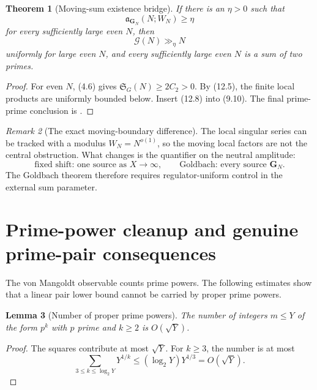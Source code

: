 \documentclass[11pt]{article}
\newtheorem{theorem}{Theorem}[section]
\newtheorem{lemma}[theorem]{Lemma}
\theoremstyle{definition}
\theoremstyle{remark}
\newtheorem{remark}[theorem]{Remark}
\begin{document}
\begin{theorem}[Moving-sum existence bridge]
\label{thm:Goldbach-lower-bridge}
If there is an $\eta>0$ such that
\[
 \boxed{
 \mathfrak a_{\bm G_N}(N;W_N)\ge\eta}
 \tag{12.8}
\]
for every sufficiently large even $N$, then
\[
 \boxed{\mathcal G(N)\gg_\eta N}
 \tag{12.9}
\]
uniformly for large even $N$, and every sufficiently large even $N$ is a sum
of two primes.
\end{theorem}

\begin{proof}
For even $N$, \textup{(4.6)} gives
$\mathfrak S_G(N)\ge2C_2>0$.  By \textup{(12.5)}, the finite local products
are uniformly bounded below.  Insert \textup{(12.8)} into
\textup{(9.10)}.  The final prime-prime conclusion is
.
\end{proof}

\begin{remark}[The exact moving-boundary difference]
The local singular series can be tracked with a modulus $W_N=N^{o(1)}$, so the
moving local factors are not the central obstruction.  What changes is the
quantifier on the neutral amplitude:
\[
 \boxed{
 \text{fixed shift: one source as }X\to\infty,
 \qquad
 \text{Goldbach: every source }\bm G_N.}
 \tag{12.10}
\]
The Goldbach theorem therefore requires regulator-uniform control in the
external sum parameter.
\end{remark}

\section{Prime-power cleanup and genuine prime-pair consequences}
\label{sec:prime-power-cleanup}

The von Mangoldt observable counts prime powers.  The following estimates show
that a linear pair lower bound cannot be carried by proper prime powers.

\begin{lemma}[Number of proper prime powers]
\label{lem:prime-power-count}
The number of integers $m\le Y$ of the form $p^k$ with $p$ prime and $k\ge2$
is $O(\sqrt Y)$.
\end{lemma}

\begin{proof}
The squares contribute at most $\sqrt Y$.  For $k\ge3$, the number is at most
\[
 \sum_{3\le k\le\log_2Y}Y^{1/k}
 \le(\log_2Y)Y^{1/3}=O(\sqrt Y).
\]
\end{proof}
\end{document}
